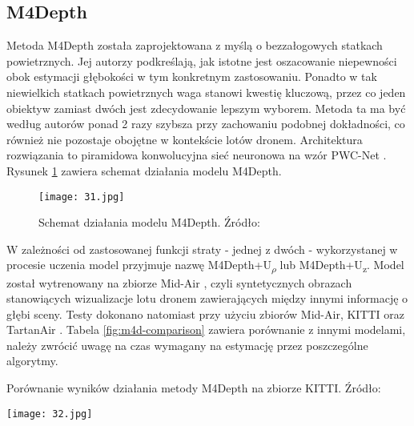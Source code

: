 \subsection{M4Depth}
Metoda M4Depth \cite{fonder2023technique} została zaprojektowana z myślą o bezzałogowych statkach powietrznych. Jej autorzy podkreślają, jak istotne jest oszacowanie niepewności obok estymacji głębokości w tym konkretnym zastosowaniu. Ponadto w tak niewielkich statkach powietrznych waga stanowi kwestię kluczową, przez co jeden obiektyw zamiast dwóch jest zdecydowanie lepszym wyborem. Metoda ta ma być według autorów ponad 2 razy szybsza przy zachowaniu podobnej dokładności, co również nie pozostaje obojętne w kontekście lotów dronem. Architektura rozwiązania to piramidowa konwolucyjna sieć neuronowa na wzór PWC-Net \cite{sun2018pwcnet}. Rysunek \ref{fig:m4d-schema} zawiera schemat działania modelu M4Depth.
\begin{figure}[H]
    \centering
    \texttt{[image: 31.jpg]}
    \caption{Schemat działania modelu M4Depth. Źródło: \cite{fonder2023technique}}
    \label{fig:m4d-schema}
\end{figure}
W zależności od zastosowanej funkcji straty - jednej z dwóch - wykorzystanej w procesie uczenia model przyjmuje nazwę M4Depth+U\textsubscript{$\rho$} lub M4Depth+U\textsubscript{z}.
Model został wytrenowany na zbiorze Mid-Air \cite{fonder2019midair}, czyli syntetycznych obrazach stanowiących wizualizacje lotu dronem zawierających między innymi informację o głębi sceny. Testy dokonano natomiast przy użyciu zbiorów Mid-Air, KITTI oraz TartanAir \cite{wang2020tartanair}. Tabela \ref{fig:m4d-comparison} zawiera porównanie z innymi modelami, należy zwrócić uwagę na czas wymagany na estymację przez poszczególne algorytmy.
\begin{table}[H]
    \centering
    \caption{Porównanie wyników działania metody M4Depth na zbiorze KITTI. Źródło: \cite{fonder2023technique}}
    \texttt{[image: 32.jpg]}
    \label{fig:m4d-comparison}
\end{table}

